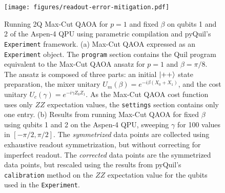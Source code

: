 \documentclass[12pt]{iopart}
\begin{document}
\begin{figure}
    \centering
    \texttt{[image: figures/readout-error-mitigation.pdf]}
    \caption{
    Running 2Q Max-Cut QAOA for $p=1$ and fixed $\beta$ on qubits 1 and 2 of the Aspen-4 QPU using parametric compilation and pyQuil's \texttt{Experiment} framework. (a) Max-Cut QAOA expressed as an \texttt{Experiment} object. The \texttt{program} section contains the Quil program equivalent to the Max-Cut QAOA ansatz for $p = 1$ and $\beta = \pi/8$. The ansatz is composed of three parts: an initial $\ket{++}$ state preparation, the mixer unitary $U_m(\beta) = e^{-i\beta (X_0 + X_1)}$, and the cost unitary $U_c(\gamma) = e^{-i\gamma Z_0 Z_1}$. As the Max-Cut QAOA cost function uses only $ZZ$ expectation values, the \texttt{settings} section contains only one entry. (b) Results from running Max-Cut QAOA for fixed $\beta$ using qubits 1 and 2 on the Aspen-4 QPU, sweeping $\gamma$ for 100 values in $[-\pi/2, \pi/2]$. The \textit{symmetrized} data points are collected using exhaustive readout symmetrization, but without correcting for imperfect readout. The \textit{corrected} data points are the symmetrized data points, but rescaled using the results from pyQuil's \texttt{calibration} method on the $ZZ$ expectation value for the qubits used in the \texttt{Experiment}.}
    \label{fig:Symmetrization}
\end{figure}
\end{document}
